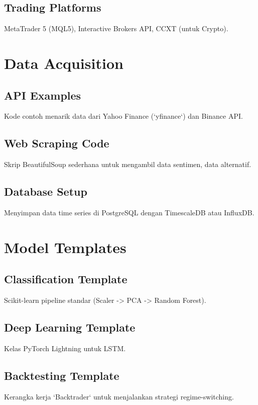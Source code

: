 \documentclass[12pt,a4paper]{book}
\begin{document}
\subsection{Trading Platforms}
MetaTrader 5 (MQL5), Interactive Brokers API, CCXT (untuk Crypto).

\section{Data Acquisition}
\subsection{API Examples}
Kode contoh menarik data dari Yahoo Finance (`yfinance`) dan Binance API.

\subsection{Web Scraping Code}
Skrip BeautifulSoup sederhana untuk mengambil data sentimen, data alternatif.

\subsection{Database Setup}
Menyimpan data time series di PostgreSQL dengan TimescaleDB atau InfluxDB.

\section{Model Templates}
\subsection{Classification Template}
Scikit-learn pipeline standar (Scaler -> PCA -> Random Forest).

\subsection{Deep Learning Template}
Kelas PyTorch Lightning untuk LSTM.

\subsection{Backtesting Template}
Kerangka kerja `Backtrader` untuk menjalankan strategi regime-switching.
\end{document}

